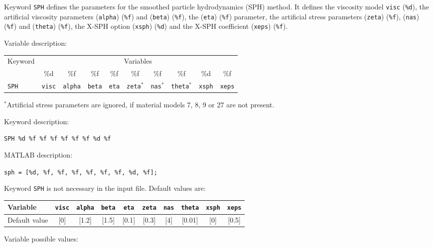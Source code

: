 Keyword \texttt{SPH} defines the parameters for the smoothed particle hydrodynamics (SPH) method. It defines the viscosity model \texttt{visc} (\texttt{\%d}), the artificial viscosity parameters (\texttt{alpha}) (\texttt{\%f}) and (\texttt{beta}) (\texttt{\%f}), the  (\texttt{eta}) (\texttt{\%f}) parameter, the artificial stress parameters (\texttt{zeta}) (\texttt{\%f}), (\texttt{nas}) (\texttt{\%f}) and (\texttt{theta}) (\texttt{\%f}), the X-SPH option (\texttt{xsph}) (\texttt{\%d}) and the X-SPH coefficient (\texttt{xeps}) (\texttt{\%f}).

Variable description:

\begin{tabular}{|l|c|c|c|c|c|c|c|c|c|}
\hline
\multirow{2}{*}{Keyword} & \multicolumn{9}{c|}{Variables} \\ \cline{2-10}
& \%d & \%f & \%f & \%f & \%f & \%f & \%f & \%d & \%f \\ \hline
\texttt{SPH} & \texttt{visc} & \texttt{alpha} & \texttt{beta} & \texttt{eta} & \texttt{zeta}$^*$ & \texttt{nas}$^*$ & \texttt{theta}$^*$ & \texttt{xsph} & \texttt{xeps} \\ \hline
\end{tabular}

$^*$Artificial stress parameters are ignored, if material models 7, 8, 9 or 27 are not present.

Keyword description:

\begin{tcolorbox}
\texttt{SPH \%d \%f \%f \%f \%f \%f \%f \%d \%f}
\end{tcolorbox}

MATLAB description:

\begin{tcolorbox}
\texttt{sph = [\%d, \%f, \%f, \%f, \%f, \%f, \%f, \%d, \%f];}
\end{tcolorbox}

Keyword \texttt{SPH} is not necessary in the input file. Default values are:

\begin{tabular}{|l|c|c|c|c|c|c|c|c|c|}
\hline
Variable & \texttt{visc} & \texttt{alpha} & \texttt{beta} & \texttt{eta} & \texttt{zeta} & \texttt{nas} & \texttt{theta} & \texttt{xsph} & \texttt{xeps} \\ \hline
Default value & [0] & [1.2] & [1.5] & [0.1] & [0.3] & [4] & [0.01] & [0] & [0.5] \\ \hline
\end{tabular}

Variable possible values:


